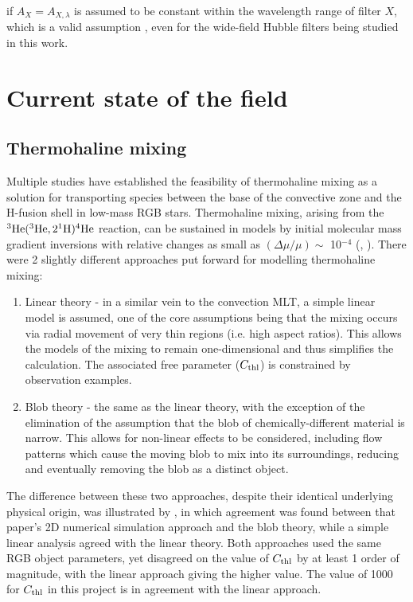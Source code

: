 \documentclass[12pt, a4paper]{report}
\begin{document}
if $A_{X} = A_{X,\lambda}$ is assumed to be constant within the wavelength range of filter $X$, which is a valid assumption \citep{2008PASP..120..583G}, even for the wide-field Hubble filters being studied in this work.

\chapter{Current state of the field}
\section{Thermohaline mixing}
Multiple studies have established the feasibility of thermohaline mixing as a solution for transporting species between the base of the convective zone and the H-fusion shell in low-mass RGB stars. Thermohaline mixing, arising from the $^{3}\textnormal{He}(^{3}\textnormal{He},2^{1}\textnormal{H})^{4}\textnormal{He}$ reaction, can be sustained in models by initial molecular mass gradient inversions with relative changes as small as $(\Delta\mu / \mu) \sim$ 10$^{-4}$ (\cite{2006Sci...314.1580E}, \cite{2010ApJ...723..563D}). There were 2 slightly different approaches put forward for modelling thermohaline mixing:

\begin{enumerate}

\item Linear theory \citep{1972ApJ...172..165U} - in a similar vein to the convection MLT, a simple linear model is assumed, one of the core assumptions being that the mixing occurs via radial movement of very thin regions (i.e. high aspect ratios). This allows the models of the mixing to remain one-dimensional and thus simplifies the calculation. The associated free parameter ($C_{\textnormal{thl}}$) is constrained by observation examples.
\item Blob theory \citep{1980A&A....91..175K} - the same as the linear theory, with the exception of the elimination of the assumption that the blob of chemically-different material is narrow. This allows for non-linear effects to be considered, including flow patterns which cause the moving blob to mix into its surroundings, reducing and eventually removing the blob as a distinct object.
\end{enumerate}

The difference between these two approaches, despite their identical underlying physical origin, was illustrated by \cite{2010ApJ...723..563D}, in which agreement was found between that paper's 2D numerical simulation approach and the blob theory, while a simple linear analysis agreed with the linear theory. Both approaches used the same RGB object parameters, yet disagreed on the value of $C_{\textnormal{thl}}$ by at least 1 order of magnitude, with the linear approach giving the higher value. The value of 1000 for $C_{\textnormal{thl}}$ in this project is in agreement with the linear approach.
\end{document}
